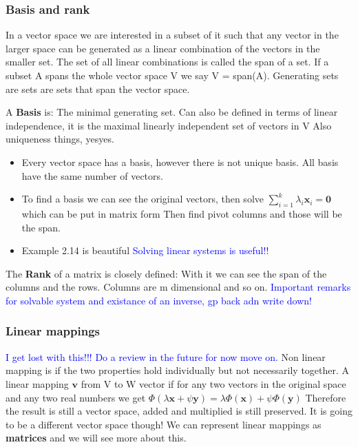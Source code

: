 \documentclass{article}
\newcommand{\tblue}[1]{\textcolor{blue}{#1}}
\begin{document}
\subsubsection{Basis and rank}
In a vector space we are interested in a subset of it such that any vector in the larger space 
can be generated as a linear combination of the vectors in the smaller set.
The set of all linear combinations is called the span of a set. If a subset A spans the whole vector space V we say 
V = span(A). Generating sets are sets are sets that span the vector space.

A \textbf{Basis} is: The minimal generating set.
Can also be defined in terms of linear independence, it is the maximal linearly independent set of vectors in V
Also uniqueness things, yesyes.
\begin{itemize}
    \item Every vector space has a basis, however there is not unique basis. All basis have the same number of vectors.
    \item To find a basis we can see the original vectors, then solve $\sum_{i=1}^{k}\lambda_i \textbf{x}_i = \textbf{0}$ which can be put in matrix form
    Then find pivot columns and those will be the span. 
    \item Example 2.14 is beautiful \tblue{Solving linear systems is useful!!}
\end{itemize}

The \textbf{Rank} of a matrix is closely defined:
With it we can see the span of the columns and the rows. Columns are m dimensional and so on.
\tblue{Important remarks for solvable system and existance of an inverse, gp back adn write down!}

\subsubsection{Linear mappings}
\tblue{I get lost with this!!! Do a review in the future for now move on.}
Non linear mapping is if the two properties hold individually but not necessarily together.
A linear mapping $\textbf{v}$ from V to W vector if for any two vectors in the original space
and any two real numbers we get $\Phi (\lambda \textbf{x} + \psi  \textbf{y}) =\lambda \Phi ( \textbf{x}) +\psi  \Phi (\textbf{y})$
Therefore the result is still a vector space, added and multiplied is still preserved. It is going to be a different vector space though!
We can represent linear mappings as \textbf{matrices} and we will see more about this.
\end{document}
